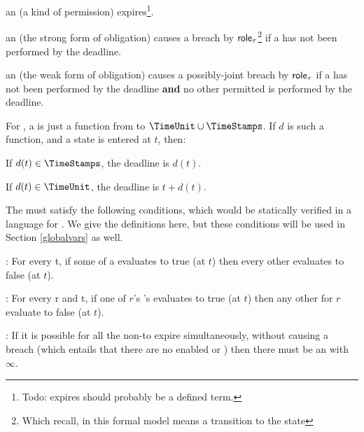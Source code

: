 \documentclass[12pt]{article}
\begin{document}
\begin{LPPI}
	\item an \enabled \mayntran (a kind of permission) expires\footnote{Todo: expires should probably be a defined term.}.
	\item an \enabled \mustntran (the strong form of obligation) causes a breach by $\textsf{role}_{\tau}$\footnote{Which recall, in this formal model means a transition to the state \breached{\{\role{\tau}\}}} if a \compatible \Event has not been performed by the deadline. 
	\item an \enabled \rmustntran (the weak form of obligation) causes a possibly-joint breach by $\textsf{role}_{\tau}$ if a \compatible \Event has not been performed by the deadline {\bf and} no other permitted \Event is performed by the deadline. 
	\end{LPPI}
For \FSContracts, a \DeadlineFn is just a function from \TimeStamps to $\TimeUnit \cup \TimeStamps$. If $d$ is such a function, and a state is entered at \TimeStamp $t$, then:
\begin{LPPI}
\item If $d(t) \in \TimeStamps$, the deadline is $d(t)$.
	\item If $d(t) \in \TimeUnit$, the deadline is $t + d(t)$.
\end{LPPI}

The \TGuards must satisfy the following conditions, which would be statically verified in a language for \Contracts. We give the \FSContracts definitions here, but these conditions will be used in Section \ref{globalvars} as well.
\medskip

\noindent {}: For every \TimeStamp t, if some \TGuard of a \mustntran evaluates to true (at $t$) then every other \TGuard evaluates to false (at $t$). 
\medskip

\noindent {}: For every \Role r and \TimeStamp t, if one of $r$'s \rmustntrans's \TGuards evaluates to true (at $t$) then any other \rmustntrans for $r$ evaluate to false (at $t$).
\medskip

\noindent {}: If it is possible for all the \enabled non-\Env \transitions to expire simultaneously, without causing a breach (which entails that there are no enabled \mustntrans or \rmustntrans) then there must be an \depTrans{\Env} with \Deadline $\infty$.
\smallskip



%
\end{document}
